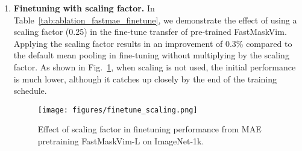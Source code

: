 \begin{enumerate}
\begin{table}[!h]
    \caption{Comparison of alternate layer lr decay vs. per layer lr decay in finetuning} 
    \begin{center}
\end{center}
    \label{tab:ablation_fastmae_lrdecay}
\end{table}


\item \textbf{Finetuning with scaling factor.} In Table~\ref{tab:ablation_fastmae_finetune}, we demonstrate the effect of using a scaling factor (0.25) in the fine-tune transfer of pre-trained FastMaskVim. Applying the scaling factor results in an improvement of 0.3\% compared to the default mean pooling in fine-tuning without multiplying by the scaling factor. As shown in Fig.~\ref{fig:finetune_scaling}, when scaling is not used, the initial performance is much lower, although it catches up closely by the end of the training schedule.


\begin{table}[!h]
    \caption{Effect of scaling factor in finetuning} 
    \begin{center}
\end{center}
    \label{tab:ablation_fastmae_finetune}
\end{table}



\begin{figure}[h]
\centering
    \texttt{[image: figures/finetune\_scaling.png]}
    \caption{Effect of scaling factor in finetuning performance from MAE pretraining FastMaskVim-L on ImageNet-1k.
    }
    \label{fig:finetune_scaling}
\end{figure}


\end{enumerate}
